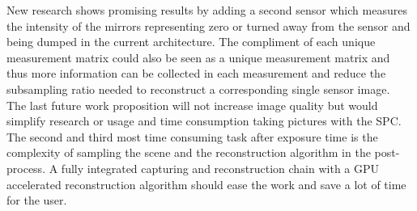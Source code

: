 New research shows promising results by adding a second sensor which measures the intensity of the mirrors representing zero or turned away from the sensor and being dumped in the current architecture. The compliment of each unique measurement matrix could also be seen as a unique measurement matrix and thus more information can be collected in each measurement and reduce the subsampling ratio needed to reconstruct a corresponding single sensor image.\cite{article:nature_dual_sensor}\\[0.1in]

The last future work proposition will not increase image quality but would simplify research or usage and time consumption taking pictures with the SPC. The second and third most time consuming task after exposure time is the complexity of sampling the scene and the reconstruction algorithm in the post-process. A fully integrated capturing and reconstruction chain with a GPU accelerated reconstruction algorithm should ease the work and save a lot of time for the user. 
 
